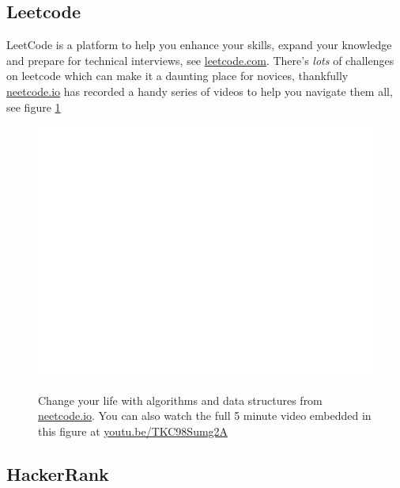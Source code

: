 \documentclass[
]{book}
\begin{document}
\hypertarget{leetcode}{%
\subsection{Leetcode}\label{leetcode}}

LeetCode is a platform to help you enhance your skills, expand your knowledge and prepare for technical interviews, see \href{https://leetcode.com}{leetcode.com}. There's \emph{lots} of challenges on leetcode which can make it a daunting place for novices, thankfully \href{https://neetcode.io}{neetcode.io} has recorded a handy series of videos to help you navigate them all, see figure \ref{fig:neetcode-fig}

\begin{figure}

{\centering \href{https://www.youtube.com/embed/TKC98Sumg2A}{\includegraphics[width=0.99\linewidth]{cdyf_files/figure-latex/neetcode-fig-1} }

}

\caption{Change your life with algorithms and data structures from \href{https://neetcode.io}{neetcode.io}. You can also watch the full 5 minute video embedded in this figure at \href{https://youtu.be/TKC98Sumg2A}{youtu.be/TKC98Sumg2A} \citep{youtube-neetcode}}\label{fig:neetcode-fig}
\end{figure}



\hypertarget{hackerrank}{%
\subsection{HackerRank}\label{hackerrank}}
\end{document}
